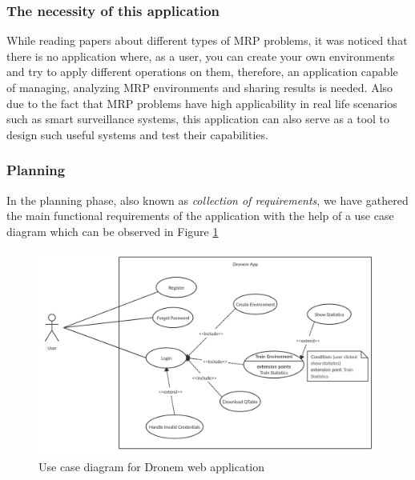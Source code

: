 \subsubsection{The necessity of this application}
While reading papers about different types of MRP problems, it was noticed that there is no application where, as a user, you can  create your own environments and try to apply different operations on them, therefore, an application capable of managing, analyzing MRP environments and sharing results is needed. Also due to the fact that MRP problems have high applicability in real life scenarios such as smart surveillance systems, this application can also serve as a tool to design such useful systems and test their capabilities.

\subsubsection{Planning}
In the planning phase, also known as \emph{collection of requirements}, we have gathered the main functional requirements of the application with the help of a use case diagram which can be observed in Figure \ref{fig:usecase}


\begin{figure}[!htb]
\centering
\includegraphics[scale=0.2]{Figures/UseCaseDronemRLFinal.jpg}
\caption{Use case diagram for Dronem web application}
\label{fig:usecase}
\end{figure}



